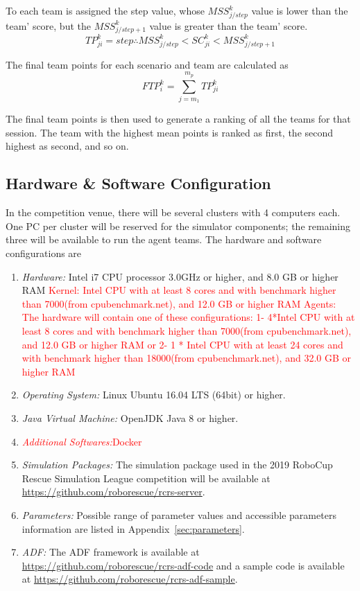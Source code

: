 \documentclass{article}
\begin{document}
To each team is assigned the step value, whose $MSS_{j/step}^{k}$ value is lower than the team' score, but the $MSS_{j/step+1}^{k}$ value is greater than the team' score.
\begin{equation}
TP_{ji}^{k} = step \therefore MSS_{j/step}^{k} < SC_{ji}^{k} < MSS_{j/step+1}^{k}
\end{equation}

The final team points for each scenario and team are calculated as
\begin{equation}
FTP_{i}^{k} = \sum_{j=m_{1}}^{m_{p}}{TP_{ji}^{k}}
\end{equation}

The final team points is then used to generate a ranking of all the teams for that session. The team with the highest mean points is ranked as first, the second highest as second, and so on.
\subsection{Hardware \& Software Configuration}
In the competition venue, there will be several clusters with 4 computers each. One PC per cluster will be reserved for the simulator components; the remaining three will be available to run the agent teams. The hardware and software configurations are
\begin{enumerate}[ ]
\item \emph{Hardware:} Intel i7 CPU processor 3.0GHz or higher, and 8.0 GB or higher RAM
\textcolor{red}{
​Kernel: 
	Intel CPU with at least 8 cores and with benchmark higher than 7000(from cpubenchmark.net), and 12.0 GB or higher RAM
Agents:
The hardware will contain one of these configurations:
1- 4*Intel CPU with at least 8 cores and with benchmark higher than 7000(from cpubenchmark.net), and 12.0 GB or higher RAM
or
2- 1 * Intel CPU with at least 24 cores and with benchmark higher than 18000(from cpubenchmark.net), and 32.0 GB or higher RAM
}
\item \emph{Operating System:} Linux Ubuntu 16.04 LTS (64bit) or higher.
\item \emph{Java Virtual Machine:} OpenJDK Java 8 or higher.
\item \textcolor{red}{\emph{Additional Softwares:}Docker}
\item \emph{Simulation Packages:} The simulation package used in the 2019 RoboCup Rescue Simulation League competition will be available at \url{https://github.com/roborescue/rcrs-server}.
\item \emph{Parameters:} Possible range of parameter values and accessible parameters information are listed in Appendix~\ref{sec:parameters}.
\item \emph{ADF:} The ADF framework is available at \url{https://github.com/roborescue/rcrs-adf-code} and a sample code is available at \url{https://github.com/roborescue/rcrs-adf-sample}.
\end{enumerate}
\end{document}
